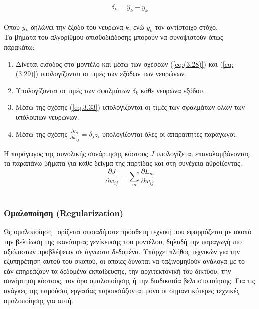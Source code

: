 \documentclass[12pt]{article}
\numberwithin{equation}{section}
\begin{document}
\begin{equation}
\delta_k = \hat{y}_k - y_k
\end{equation}\\

\noindent Όπου \(\hat{y}_k\) δηλώνει την έξοδο του νευρώνα \(k\), ενώ \(y_k\) τον αντίστοιχο στόχο.\\

\noindent Τα βήματα του αλγορίθμου οπισθοδιάδοσης μπορούν να συνοψιστούν όπως παρακάτω:

\begin{enumerate}
  \item Δίνεται είσοδος στο μοντέλο και μέσω των σχέσεων (\ref{eq:(3.28)}) και (\ref{eq:(3.29)}) υπολογίζονται οι τιμές των εξόδων των νευρώνων.
    \item Υπολογίζονται οι τιμές των σφαλμάτων \(\delta_k\) κάθε νευρώνα εξόδου.
    \item Μέσω της σχέσης (\ref{eq:3.33}) υπολογίζονται οι τιμές των σφαλμάτων όλων των υπόλοιπων νευρώνων.
    \item Μέσω της σχέσης \(\frac{\partial L_i}{\partial w_{ij}}=\delta_j z_i\) υπολογίζονται όλες οι απαραίτητες παράγωγοι.
\end{enumerate}

\noindent Η παράγωγος της συνολικής συνάρτησης κόστους \(J\) υπολογίζεται επαναλαμβάνοντας τα παραπάνω βήματα για κάθε δείγμα της παρτίδας και στη συνέχεια αθροίζοντας. \\

\begin{equation}
\frac{\partial J}{\partial w_{ij}} = \sum_m \frac{\partial L_m}{\partial w_{ij}}
\end{equation}\\

\subsubsection{Ομαλοποίηση (Regularization)}
\label{subsubsec:Regularization}

Ως ομαλοποίηση~\cite{kukačka2017regularizationdeeplearningtaxonomy} ορίζεται οποιαδήποτε πρόσθετη τεχνική που εφαρμόζεται με σκοπό την βελτίωση της ικανότητας γενίκευσης του μοντέλου, δηλαδή την παραγωγή πιο αξιόπιστων προβλέψεων σε άγνωστα δεδομένα. Υπάρχει πλήθος τεχνικών για την εξυπηρέτηση αυτού του σκοπού, οι οποίες δύναται να ταξινομηθούν ανάλογα με το εάν επηρεάζουν τα δεδομένα εκπαίδευσης, την αρχιτεκτονική του δικτύου, την συνάρτηση κόστους, τον όρο ομαλοποίησης ή την διαδικασία βελτιστοποίησης. Για τις ανάγκες της παρούσας εργασίας παρουσιάζονται μόνο οι σημαντικότερες τεχνικές ομαλοποίησης για αυτή. 
\end{document}
